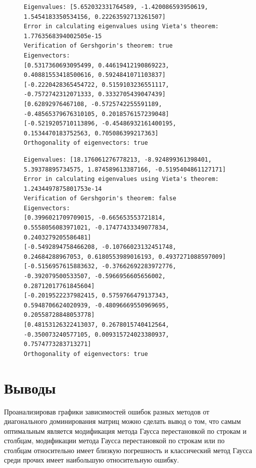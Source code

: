 \documentclass[a4paper, 14pt]{extarticle}
\begin{document}
\begin{figure}[!htb]
\begin{lstlisting}[caption={Результат работы программы},label={lst:code4}]
Eigenvalues: [5.652032331764589, -1.420086593950619, 1.5454183350534156, 0.22263592713261507]
Error in calculating eigenvalues using Vieta's theorem: 1.7763568394002505e-15
Verification of Gershgorin's theorem: true
Eigenvectors:
[0.5317360693095499, 0.44619412190869223, 0.40881553418500616, 0.5924841071103837]
[-0.2220428365454722, 0.5159103236551117, -0.7572742312071333, 0.3332705439047439]
[0.62892976467108, -0.5725742255591189, -0.48565379676310105, 0.2018576157239048]
[-0.5219205710113896, -0.45486932161400195, 0.1534470183752563, 0.705086399217363]
Orthogonality of eigenvectors: true
\end{lstlisting}
\end{figure}
\begin{figure}[!htb]
\begin{lstlisting}[caption={Результат работы программы},label={lst:code5}]
Eigenvalues: [18.176061276778213, -8.924899361398401, 5.39378895734575, 1.874589613387166, -0.5195404861127171]
Error in calculating eigenvalues using Vieta's theorem: 1.2434497875801753e-14
Verification of Gershgorin's theorem: false
Eigenvectors:
[0.3996021709709015, -0.665653553721814, 0.5558056083971021, -0.17477433349077834, 0.2403279205586481]
[-0.5492894758466208, -0.10766023132451748, 0.24684288967053, 0.6180553989016193, 0.4937271088597009]
[-0.5156957615883632, -0.37662692283972776, -0.392079500533507, -0.5966956605656002, 0.28712017761845604]
[-0.2019522237982415, 0.5759766479137343, 0.5948706624020939, -0.48096669550969695, 0.20558728848053778]
[0.48153126322413037, 0.2678015740412564, -0.350073240577105, 0.009315724023380937, 0.7574773283713271]
Orthogonality of eigenvectors: true
\end{lstlisting}
\end{figure}

\section{Выводы}\label{Sect::conclusion}

Проанализировав графики зависимостей ошибок разных методов от диагонального доминирования матриц можно сделать вывод о том, что самым оптимальным является модификация метода Гаусса перестановкой по строкам и столбцам, модификации метода Гаусса перестановкой по строкам или по столбцам относительно имеет близкую погрешность и классический метод Гаусса среди прочих имеет наибольшую относительную ошибку.
\end{document}

